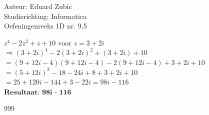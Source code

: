\documentclass[a4paper]{article}
\begin{document}
  
\noindent \large Auteur: Eduard Zubic \\
\noindent \large Studierichting: Informatica\\
\noindent \large Oefeningenreeks 1D nr. 9.5\\

\medskip

\normalsize

$ z^4 - 2z^2 + z + 10 \text{ voor } z = 3 + 2i $\\

$ \Rightarrow (3 + 2i)^4 - 2(3 + 2i)^2 + (3 + 2i) + 10$\\

$ = (9 + 12i - 4)(9 + 12i - 4) - 2(9 + 12i - 4) + 3 + 2i + 10 $\\

$ = (5 + 12i)^2 -18 -24i + 8 + 3 + 2i + 10 $\\

$ = 25 + 120i - 144 + 3 - 22i = 98i - 116$\\

$\textbf{Resultaat: 98i - 116}$




\begin{thebibliography}{999} 
\end{thebibliography}
\end{document}
